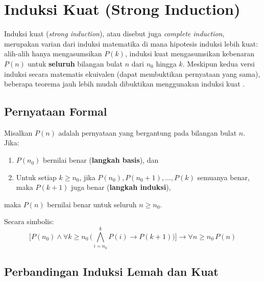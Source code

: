 \section{Induksi Kuat (Strong Induction)}

Induksi kuat (\textit{strong induction}), atau disebut juga \textit{complete induction}, merupakan varian dari induksi matematika di mana hipotesis induksi lebih kuat: alih-alih hanya mengasumsikan $P(k)$, induksi kuat mengasumsikan kebenaran $P(n)$ untuk \textbf{seluruh} bilangan bulat $n$ dari $n_0$ hingga $k$. Meskipun kedua versi induksi secara matematis ekuivalen (dapat membuktikan pernyataan yang sama), beberapa teorema jauh lebih mudah dibuktikan menggunakan induksi kuat \cite{rosen2019}.

\subsection{Pernyataan Formal}

\begin{definisi}
Misalkan $P(n)$ adalah pernyataan yang bergantung pada bilangan bulat $n$. Jika:
\begin{enumerate}
    \item $P(n_0)$ bernilai benar (\textbf{langkah basis}), dan
    \item Untuk setiap $k \geq n_0$, jika $P(n_0), P(n_0+1), \ldots, P(k)$ semuanya benar, maka $P(k+1)$ juga benar (\textbf{langkah induksi}),
\end{enumerate}
maka $P(n)$ bernilai benar untuk seluruh $n \geq n_0$.
\end{definisi}

Secara simbolis:
\[ \Big[ P(n_0) \wedge \forall k \geq n_0\, \Big(\bigwedge_{i=n_0}^{k} P(i) \rightarrow P(k+1)\Big) \Big] \rightarrow \forall n \geq n_0\, P(n) \]

\subsection{Perbandingan Induksi Lemah dan Kuat}

